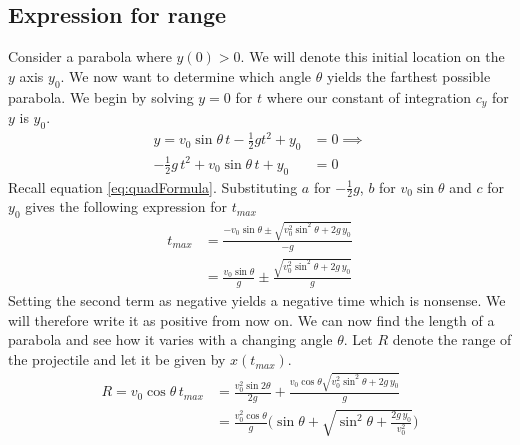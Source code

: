 \documentclass[%
aip,
jmp,
amsmath,amssymb,
reprint,%
]{revtex4-1}
\begin{document}
	\subsection{Expression for range}
	Consider a parabola where $y(0) > 0$. We will denote this initial location on the $y$ axis $y_0$. We now want to determine which angle $\theta$ yields the farthest possible parabola. We begin by solving $y=0$ for $t$ where our constant of integration $c_y$ for $y$ is $y_0$.
	\begin{align}\nonumber
		y=v_0\sin\theta\,t - \frac12gt^2 + y_0 &= 0 \implies\\\nonumber
		-\frac12g\,t^2+v_0\sin\theta\,t+y_0 &= 0
	\end{align}
	Recall equation \eqref{eq:quadFormula}. Substituting $a$ for $-\frac12g$, $b$ for $v_0\sin\theta$ and $c$ for $y_0$ gives the following expression for $t_{max}$
	\begin{align}\nonumber
		t_{max} &= \frac{-v_0\sin\theta\pm\sqrt{v_{0}^2\sin^2\theta+2g\,y_0}}{-g}\\\label{eq:tMaxFromHeight}
		&=\frac{v_0\sin\theta}{g}\pm\frac{\sqrt{v_{0}^2\sin^2\theta+2g\,y_0}}{g}
	\end{align}
	Setting the second term as negative yields a negative time which is nonsense. We will therefore write it as positive from now on. We can now find the length of a parabola and see how it varies with a changing angle $\theta$. Let $R$ denote the range of the projectile and let it be given by $x(t_{max})$.
	\begin{align}\nonumber
		R = v_0\cos\theta\,t_{max} &= \frac{v_{0}^2\sin2\theta}{2g}+ \frac{v_0\cos\theta\sqrt{v_{0}^2\sin^2\theta+2g\,y_0}}{g} \\\nonumber
		&=\frac{v_{0}^2\cos\theta}{g}\Big(\sin\theta+\sqrt{\sin^2\theta+\frac{2g\,y_0}{v_{0}^2}}\Big)
	\end{align}
\end{document}
